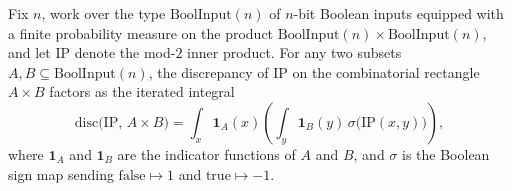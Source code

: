 \begin{lemma}
\label{CommunicationComplexity.Functions.InnerProduct.discrepancy_prod_eq_integral}
\leanok
{}
Fix $n$, work over the type $\mathrm{BoolInput}(n)$ of $n$-bit Boolean inputs equipped
with a finite probability measure on the product
$\mathrm{BoolInput}(n)\times\mathrm{BoolInput}(n)$, and let $\mathrm{IP}$ denote the
mod-$2$ inner product. For any two subsets $A, B \subseteq \mathrm{BoolInput}(n)$, the
discrepancy of $\mathrm{IP}$ on the combinatorial rectangle $A\times B$ factors as the
iterated integral
\[
  \mathrm{disc}\bigl(\mathrm{IP},\, A\times B\bigr)
= \int_{x} \mathbf{1}_A(x)\left(\int_{y}
\mathbf{1}_B(y)\,\sigma\bigl(\mathrm{IP}(x,y)\bigr)\right),
\]
where $\mathbf{1}_A$ and $\mathbf{1}_B$ are the indicator functions of $A$ and $B$, and
$\sigma$ is the Boolean sign map sending $\mathrm{false}\mapsto 1$ and
$\mathrm{true}\mapsto -1$.
\end{lemma}

